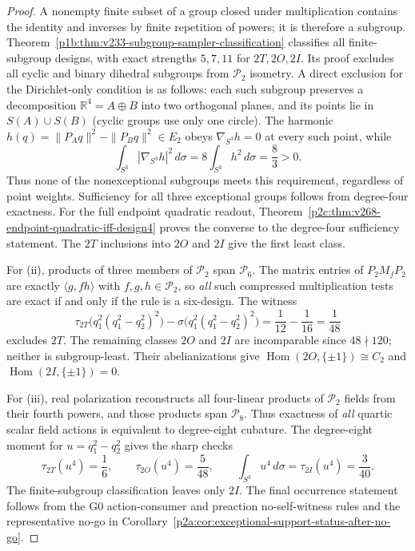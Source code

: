 \documentclass[12pt,a4paper]{article}
\begin{document}
\begin{proof}
A nonempty finite subset of a group closed under multiplication
contains the identity and inverses by finite repetition of powers;
it is therefore a subgroup.  Theorem~\ref{p1b:thm:v233-subgroup-sampler-classification}
classifies all finite-subgroup designs, with exact strengths $5,7,11$
for $2T,2O,2I$.  Its proof excludes all cyclic and binary dihedral
subgroups from $\mathcal P_2$ isometry.  A direct exclusion for the
Dirichlet-only condition is as follows: each such subgroup preserves
a decomposition $\mathbb R^4=A\oplus B$ into two orthogonal planes,
and its points lie in $S(A)\cup S(B)$ (cyclic groups use only one
circle).  The harmonic
$h(q)=\|P_Aq\|^2-\|P_Bq\|^2\in E_2$
obeys $\nabla_{S^3}h=0$ at every such point, while
\[
 \int_{S^3}|\nabla_{S^3}h|^2\,d\sigma
 =8\int_{S^3}h^2\,d\sigma=\frac83>0.
\]
Thus none of the nonexceptional subgroups meets this requirement,
regardless of point weights.  Sufficiency for all three exceptional
groups follows from degree-four exactness.  For the full endpoint
quadratic readout, Theorem~\ref{p2c:thm:v268-endpoint-quadratic-iff-design4}
proves the converse to the degree-four sufficiency statement.
The $2T$ inclusions into $2O$ and $2I$ give the first least class.

For (ii), products of three members of $\mathcal P_2$ span
$\mathcal P_6$.  The matrix entries of
$P_2M_fP_2$ are exactly $\langle g,fh\rangle$ with
$f,g,h\in\mathcal P_2$, so \emph{all} such compressed multiplication
tests are exact if and only if the rule is a six-design.
The witness
\[
 \tau_{2T}\big(q_1^2(q_1^2-q_2^2)^2\big)
 -\sigma\big(q_1^2(q_1^2-q_2^2)^2\big)
 =\frac1{12}-\frac1{16}=\frac1{48}
\]
excludes $2T$.  The remaining classes $2O$ and $2I$ are
incomparable since $48\nmid120$; neither is subgroup-least.
Their abelianizations give
$\operatorname{Hom}(2O,\{\pm1\})\cong C_2$
and $\operatorname{Hom}(2I,\{\pm1\})=0$.

For (iii), real polarization reconstructs all four-linear products
of $\mathcal P_2$ fields from their fourth powers, and those products
span $\mathcal P_8$.  Thus exactness of \emph{all} quartic scalar
field actions is equivalent to degree-eight cubature.  The degree-eight
moment for $u=q_1^2-q_2^2$ gives the sharp checks
\[
 \tau_{2T}(u^4)=\frac16,\qquad
 \tau_{2O}(u^4)=\frac5{48},\qquad
 \int_{S^3}u^4\,d\sigma=\tau_{2I}(u^4)=\frac3{40}.
\]
The finite-subgroup classification leaves only $2I$.
The final occurrence statement follows from the G0 action-consumer and
preaction no-self-witness rules and the representative no-go in
Corollary~\ref{p2a:cor:exceptional-support-status-after-no-go}.
\end{proof}
\end{document}
